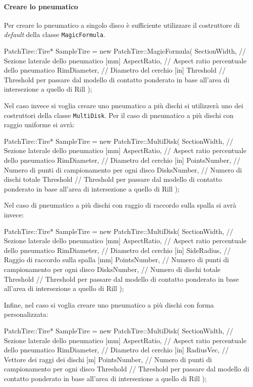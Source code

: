 \paragraph{Creare lo pneumatico}
Per creare lo pneumatico a singolo disco è sufficiente utilizzare il costruttore di \textit{default} della classe \texttt{MagicFormula}.
\begin{pseudoc}
	PatchTire::Tire* SampleTire = new PatchTire::MagicFormula(
		SectionWidth, // Sezione laterale dello pneumatico [mm]
		AspectRatio,  // Aspect ratio percentuale dello pneumatico
		RimDiameter,  // Diametro del cerchio [in]
		Threshold     // Threshold per passare dal modello di contatto ponderato in base all'area di intersezione a quello di Rill 
		);
\end{pseudoc}
Nel caso invece si voglia creare uno pneumatico a più dischi si utilizzerà uno dei costruttori della classe \texttt{MultiDisk}. Per il caso di pneumatico a più dischi con raggio uniforme si avrà:
\begin{pseudoc}
	PatchTire::Tire* SampleTire = new PatchTire::MultiDisk(
		SectionWidth, // Sezione laterale dello pneumatico [mm]
		AspectRatio,  // Aspect ratio percentuale dello pneumatico
		RimDiameter,  // Diametro del cerchio [in]
		PointsNumber, // Numero di punti di campionamento per ogni disco
		DisksNumber,  // Numero di dischi totale
		Threshold     // Threshold per passare dal modello di contatto ponderato in base all'area di intersezione a quello di Rill 
		);
\end{pseudoc}
Nel caso di pneumatico a più dischi con raggio di raccordo sulla spalla si avrà invece:
\begin{pseudoc}
	PatchTire::Tire* SampleTire = new PatchTire::MultiDisk(
		SectionWidth, // Sezione laterale dello pneumatico [mm]
		AspectRatio,  // Aspect ratio percentuale dello pneumatico
		RimDiameter,  // Diametro del cerchio [in]
		SideRadius,   // Raggio di raccordo sulla spalla [mm]
		PointsNumber, // Numero di punti di campionamento per ogni disco
		DisksNumber,  // Numero di dischi totale
		Threshold     // Threshold per passare dal modello di contatto ponderato in base all'area di intersezione a quello di Rill 
		);
\end{pseudoc}
Infine, nel caso si voglia creare uno pneumatico a più dischi con forma personalizzata:
\begin{pseudoc}
	PatchTire::Tire* SampleTire = new PatchTire::MultiDisk(
		SectionWidth, // Sezione laterale dello pneumatico [mm]
		AspectRatio,  // Aspect ratio percentuale dello pneumatico
		RimDiameter,  // Diametro del cerchio [in]
		RadiusVec,    // Vettore dei raggi dei dischi [m]
		PointsNumber, // Numero di punti di campionamento per ogni disco
		Threshold     // Threshold per passare dal modello di contatto ponderato in base all'area di intersezione a quello di Rill 
		);
\end{pseudoc}
%
